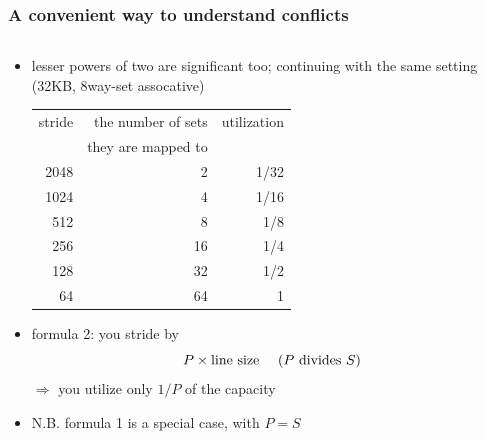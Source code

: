 \documentclass[12pt,dvipdfmx]{beamer}
\newcommand{\ao}[1]{{\color{blue}#1}}
\begin{document}
\begin{frame}
  \frametitle{A convenient way to understand conflicts}
\begin{columns}
  \begin{column}{0.6\textwidth}
    \begin{itemize}
    \item lesser powers of two are significant too; continuing with
      the same setting (32KB, 8way-set assocative)
      {\tiny
      \begin{tabular}{|r|r|r|}\hline
        stride & the number of sets & utilization \\
               & they are mapped to & \\\hline
        2048   & 2  & 1/32 \\
        1024   & 4  & 1/16 \\
        512    & 8  & 1/8 \\
        256    & 16 & 1/4 \\
        128    & 32 & 1/2 \\
        64    & 64 & 1 \\
        \hline
      \end{tabular}}

  \item formula 2: you stride by
    \[ \ao{P \times \mbox{line size \quad ($P$ divides $S$)}} \]
    $\Rightarrow$ you utilize only $1/P$ of the capacity
    
  \item N.B. formula 1 is a special case, with $P = S$
    \end{itemize}
  \end{column}


\end{columns}
\end{frame}
\end{document}

